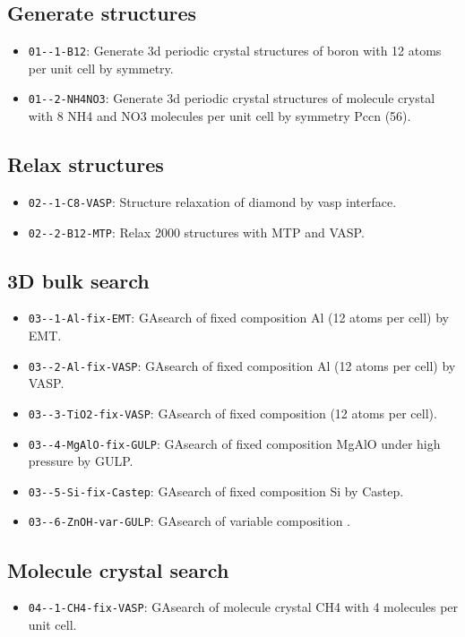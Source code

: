 \documentclass[12pt,oneside]{book}
\begin{document}
\subsection{Generate structures}\label{Generate structures}
\begin{itemize}
\item \verb|01--1-B12|: Generate 3d periodic crystal structures of boron with 12 atoms per unit cell by symmetry.
\item \verb|01--2-NH4NO3|: Generate 3d periodic crystal structures of molecule crystal with 8 NH4 and NO3 molecules per unit cell by symmetry Pccn (56).
\end{itemize}

\subsection{Relax structures}\label{Relax structures}
\begin{itemize}
\item \verb|02--1-C8-VASP|: Structure relaxation of diamond by vasp interface. 
\item \verb|02--2-B12-MTP|: Relax 2000 structures with MTP and VASP.
\end{itemize}

\subsection{3D bulk search}\label{3D bulk search}
\begin{itemize}
\item \verb|03--1-Al-fix-EMT|: GAsearch of fixed composition Al (12 atoms per cell) by EMT.
\item \verb|03--2-Al-fix-VASP|: GAsearch of fixed composition Al (12 atoms per cell) by VASP.
\item \verb|03--3-TiO2-fix-VASP|: GAsearch of fixed composition  (12 atoms per cell).
\item \verb|03--4-MgAlO-fix-GULP|: GAsearch of fixed composition MgAlO under high pressure by GULP.
\item \verb|03--5-Si-fix-Castep|: GAsearch of fixed composition Si by Castep.
\item \verb|03--6-ZnOH-var-GULP|: GAsearch of variable composition .
\end{itemize}

\subsection{Molecule crystal search}\label{Molecule crystal search}
\begin{itemize}
\item \verb|04--1-CH4-fix-VASP|: GAsearch of molecule crystal CH4 with 4 molecules per unit cell.
\end{itemize}
\end{document}
